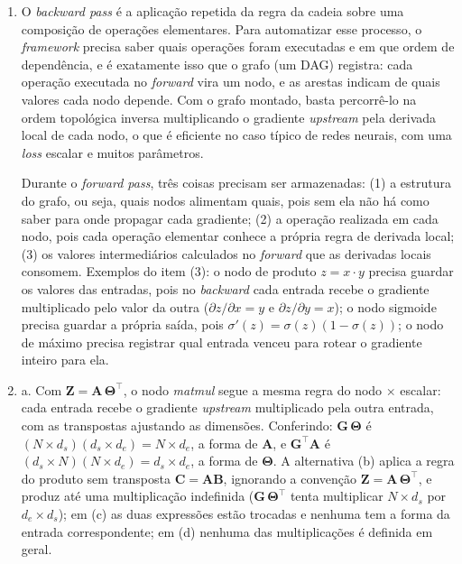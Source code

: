 \documentclass{dlproblemset}
\begin{document}
\begin{enumerate}[1)]
    \item O \textit{backward pass} é a aplicação repetida da regra da cadeia sobre uma composição de operações elementares. Para automatizar esse processo, o \textit{framework} precisa saber quais operações foram executadas e em que ordem de dependência, e é exatamente isso que o grafo (um DAG) registra: cada operação executada no \textit{forward} vira um nodo, e as arestas indicam de quais valores cada nodo depende. Com o grafo montado, basta percorrê-lo na ordem topológica inversa multiplicando o gradiente \textit{upstream} pela derivada local de cada nodo, o que é eficiente no caso típico de redes neurais, com uma \textit{loss} escalar e muitos parâmetros.

    Durante o \textit{forward pass}, três coisas precisam ser armazenadas: (1) a estrutura do grafo, ou seja, quais nodos alimentam quais, pois sem ela não há como saber para onde propagar cada gradiente; (2) a operação realizada em cada nodo, pois cada operação elementar conhece a própria regra de derivada local; (3) os valores intermediários calculados no \textit{forward} que as derivadas locais consomem. Exemplos do item (3): o nodo de produto $z = x \cdot y$ precisa guardar os valores das entradas, pois no \textit{backward} cada entrada recebe o gradiente multiplicado pelo valor da outra ($\partial z/\partial x = y$ e $\partial z/\partial y = x$); o nodo sigmoide precisa guardar a própria saída, pois $\sigma'(z) = \sigma(z)(1 - \sigma(z))$; o nodo de máximo precisa registrar qual entrada venceu para rotear o gradiente inteiro para ela.

    \item a. Com $\mathbf{Z} = \mathbf{A}\,\mathbf{\Theta}^{\top}$, o nodo \textit{matmul} segue a mesma regra do nodo $\times$ escalar: cada entrada recebe o gradiente \textit{upstream} multiplicado pela outra entrada, com as transpostas ajustando as dimensões. Conferindo: $\mathbf{G}\,\mathbf{\Theta}$ é $(N\times d_s)(d_s\times d_e) = N\times d_e$, a forma de $\mathbf{A}$, e $\mathbf{G}^{\top}\mathbf{A}$ é $(d_s\times N)(N\times d_e) = d_s\times d_e$, a forma de $\mathbf{\Theta}$. A alternativa (b) aplica a regra do produto sem transposta $\mathbf{C} = \mathbf{A}\mathbf{B}$, ignorando a convenção $\mathbf{Z} = \mathbf{A}\,\mathbf{\Theta}^{\top}$, e produz até uma multiplicação indefinida ($\mathbf{G}\,\mathbf{\Theta}^{\top}$ tenta multiplicar $N\times d_s$ por $d_e\times d_s$); em (c) as duas expressões estão trocadas e nenhuma tem a forma da entrada correspondente; em (d) nenhuma das multiplicações é definida em geral.


\end{enumerate}
\end{document}
